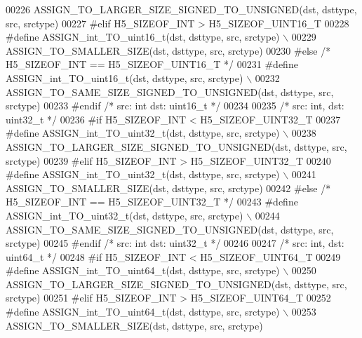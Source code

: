 \begin{DoxyCode}
00226 \textcolor{preprocessor}{        ASSIGN\_TO\_LARGER\_SIZE\_SIGNED\_TO\_UNSIGNED(dst, dsttype, src, srctype)}
00227 \textcolor{preprocessor}{#elif H5\_SIZEOF\_INT > H5\_SIZEOF\_UINT16\_T}
00228 \textcolor{preprocessor}{    #define ASSIGN\_int\_TO\_uint16\_t(dst, dsttype, src, srctype) \(\backslash\)}
00229 \textcolor{preprocessor}{        ASSIGN\_TO\_SMALLER\_SIZE(dst, dsttype, src, srctype)}
00230 \textcolor{preprocessor}{#else }\textcolor{comment}{/* H5\_SIZEOF\_INT == H5\_SIZEOF\_UINT16\_T */}\textcolor{preprocessor}{}
00231 \textcolor{preprocessor}{    #define ASSIGN\_int\_TO\_uint16\_t(dst, dsttype, src, srctype) \(\backslash\)}
00232 \textcolor{preprocessor}{        ASSIGN\_TO\_SAME\_SIZE\_SIGNED\_TO\_UNSIGNED(dst, dsttype, src, srctype)}
00233 \textcolor{preprocessor}{#endif }\textcolor{comment}{/* src: int dst: uint16\_t */}\textcolor{preprocessor}{}
00234 
00235 \textcolor{comment}{/* src: int, dst: uint32\_t */}
00236 \textcolor{preprocessor}{#if H5\_SIZEOF\_INT < H5\_SIZEOF\_UINT32\_T}
00237 \textcolor{preprocessor}{    #define ASSIGN\_int\_TO\_uint32\_t(dst, dsttype, src, srctype) \(\backslash\)}
00238 \textcolor{preprocessor}{        ASSIGN\_TO\_LARGER\_SIZE\_SIGNED\_TO\_UNSIGNED(dst, dsttype, src, srctype)}
00239 \textcolor{preprocessor}{#elif H5\_SIZEOF\_INT > H5\_SIZEOF\_UINT32\_T}
00240 \textcolor{preprocessor}{    #define ASSIGN\_int\_TO\_uint32\_t(dst, dsttype, src, srctype) \(\backslash\)}
00241 \textcolor{preprocessor}{        ASSIGN\_TO\_SMALLER\_SIZE(dst, dsttype, src, srctype)}
00242 \textcolor{preprocessor}{#else }\textcolor{comment}{/* H5\_SIZEOF\_INT == H5\_SIZEOF\_UINT32\_T */}\textcolor{preprocessor}{}
00243 \textcolor{preprocessor}{    #define ASSIGN\_int\_TO\_uint32\_t(dst, dsttype, src, srctype) \(\backslash\)}
00244 \textcolor{preprocessor}{        ASSIGN\_TO\_SAME\_SIZE\_SIGNED\_TO\_UNSIGNED(dst, dsttype, src, srctype)}
00245 \textcolor{preprocessor}{#endif }\textcolor{comment}{/* src: int dst: uint32\_t */}\textcolor{preprocessor}{}
00246 
00247 \textcolor{comment}{/* src: int, dst: uint64\_t */}
00248 \textcolor{preprocessor}{#if H5\_SIZEOF\_INT < H5\_SIZEOF\_UINT64\_T}
00249 \textcolor{preprocessor}{    #define ASSIGN\_int\_TO\_uint64\_t(dst, dsttype, src, srctype) \(\backslash\)}
00250 \textcolor{preprocessor}{        ASSIGN\_TO\_LARGER\_SIZE\_SIGNED\_TO\_UNSIGNED(dst, dsttype, src, srctype)}
00251 \textcolor{preprocessor}{#elif H5\_SIZEOF\_INT > H5\_SIZEOF\_UINT64\_T}
00252 \textcolor{preprocessor}{    #define ASSIGN\_int\_TO\_uint64\_t(dst, dsttype, src, srctype) \(\backslash\)}
00253 \textcolor{preprocessor}{        ASSIGN\_TO\_SMALLER\_SIZE(dst, dsttype, src, srctype)}

\end{DoxyCode}
